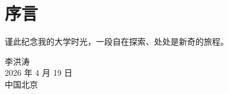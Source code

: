 \documentclass[a4paper,12pt]{article}
\begin{document}




\newpage


\tableofcontents

\newpage

\section*{序言}

谨此纪念我的大学时光，一段自在探索、处处是新奇的旅程。

\vfill

\begin{flushright}
  李洪涛 \\
  2026 年 4 月 19 日 \\
  中国北京
\end{flushright}

\clearpage

\setcounter{page}{1}


\clearpage

\clearpage

\clearpage

\clearpage

\clearpage

\clearpage

\clearpage

\clearpage

\clearpage

\printbibliography[heading=bibintoc,title={参考文献}]
\end{document}

